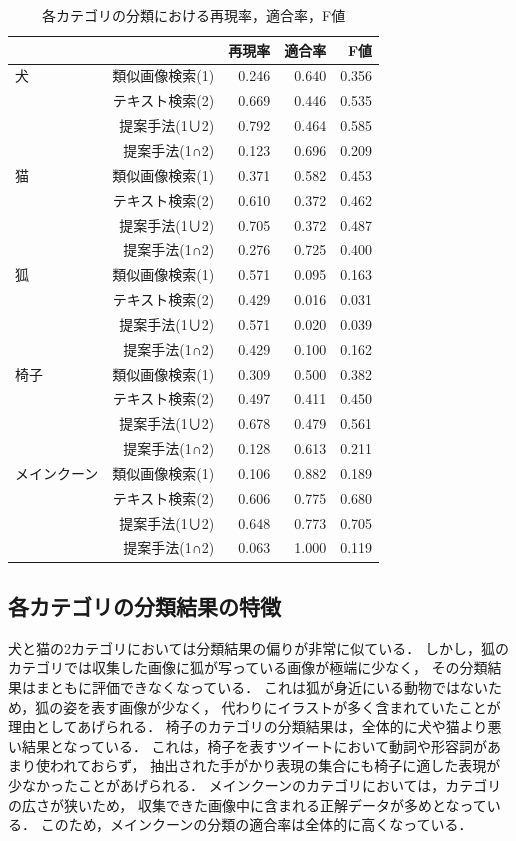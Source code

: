 \begin{table}%
\begin{center}
\caption{各カテゴリの分類における再現率，適合率，F値}
\label{tab:result-ex}
\begin{tabular}{|l|r|r|r|r|}\hline
&& 再現率& 適合率& F値\\ \hline \hline
犬
& 類似画像検索(1)& 0.246& 0.640& 0.356 \\ \cline{2-5}
& テキスト検索(2)& 0.669& 0.446& 0.535 \\ \cline{2-5}
& 提案手法(1∪2)& 0.792& 0.464& 0.585 \\ \cline{2-5}
& 提案手法(1∩2)& 0.123& 0.696& 0.209 \\ \hline
猫
& 類似画像検索(1)& 0.371& 0.582& 0.453 \\ \cline{2-5}
& テキスト検索(2)& 0.610& 0.372& 0.462 \\ \cline{2-5}
& 提案手法(1∪2)& 0.705& 0.372& 0.487 \\ \cline{2-5}
& 提案手法(1∩2)& 0.276& 0.725& 0.400 \\ \hline
狐
& 類似画像検索(1)& 0.571& 0.095& 0.163 \\ \cline{2-5}
& テキスト検索(2)& 0.429& 0.016& 0.031 \\ \cline{2-5}
& 提案手法(1∪2)& 0.571& 0.020& 0.039 \\ \cline{2-5}
& 提案手法(1∩2)& 0.429& 0.100& 0.162 \\ \hline
椅子
& 類似画像検索(1)& 0.309& 0.500& 0.382 \\ \cline{2-5}
& テキスト検索(2)& 0.497& 0.411& 0.450 \\ \cline{2-5}
& 提案手法(1∪2)& 0.678& 0.479& 0.561 \\ \cline{2-5}
& 提案手法(1∩2)& 0.128& 0.613& 0.211 \\ \hline
メインクーン
& 類似画像検索(1)& 0.106& 0.882& 0.189 \\ \cline{2-5}
& テキスト検索(2)& 0.606& 0.775& 0.680 \\ \cline{2-5}
& 提案手法(1∪2)& 0.648& 0.773& 0.705 \\ \cline{2-5}
& 提案手法(1∩2)& 0.063& 1.000& 0.119 \\ \hline
\end{tabular}
\end{center}
\end{table}

\subsection{各カテゴリの分類結果の特徴}
犬と猫の2カテゴリにおいては分類結果の偏りが非常に似ている．
しかし，狐のカテゴリでは収集した画像に狐が写っている画像が極端に少なく，
その分類結果はまともに評価できなくなっている．
これは狐が身近にいる動物ではないため，狐の姿を表す画像が少なく，
代わりにイラストが多く含まれていたことが理由としてあげられる．
椅子のカテゴリの分類結果は，全体的に犬や猫より悪い結果となっている．
これは，椅子を表すツイートにおいて動詞や形容詞があまり使われておらず，
抽出された手がかり表現の集合にも椅子に適した表現が少なかったことがあげられる．
メインクーンのカテゴリにおいては，カテゴリの広さが狭いため，
収集できた画像中に含まれる正解データが多めとなっている．
このため，メインクーンの分類の適合率は全体的に高くなっている．

